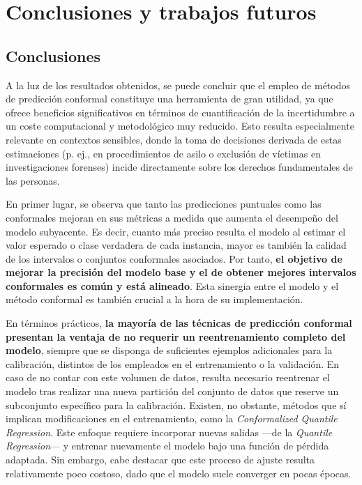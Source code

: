 \chapter{Conclusiones y trabajos futuros}

\section{Conclusiones}



A la luz de los resultados obtenidos, se puede concluir que el empleo de métodos de predicción conformal constituye una herramienta de gran utilidad, ya que ofrece beneficios significativos en términos de cuantificación de la incertidumbre a un coste computacional y metodológico muy reducido. Esto resulta especialmente relevante en contextos sensibles, donde la toma de decisiones derivada de estas estimaciones (p. ej., en procedimientos de asilo o exclusión de víctimas en investigaciones forenses) incide directamente sobre los derechos fundamentales de las personas.


En primer lugar, se observa que tanto las predicciones puntuales como las conformales mejoran en sus métricas a medida que aumenta el desempeño del modelo subyacente. Es decir, cuanto más preciso resulta el modelo al estimar el valor esperado o clase verdadera de cada instancia, mayor es también la calidad de los intervalos o conjuntos conformales asociados. Por tanto, \textbf{el objetivo de mejorar la precisión del modelo base y el de obtener mejores intervalos conformales es común y está alineado}. Esta sinergia entre el modelo y el método conformal es también crucial a la hora de su implementación.

En términos prácticos, \textbf{la mayoría de las técnicas de predicción conformal presentan la ventaja de no requerir un reentrenamiento completo del modelo}, siempre que se disponga de suficientes ejemplos adicionales para la calibración, distintos de los empleados en el entrenamiento o la validación. En caso de no contar con este volumen de datos, resulta necesario reentrenar el modelo tras realizar una nueva partición del conjunto de datos que reserve un subconjunto específico para la calibración.
Existen, no obstante, métodos que sí implican modificaciones en el entrenamiento, como la \textit{Conformalized Quantile Regression}. Este enfoque requiere incorporar nuevas salidas ---de la \textit{Quantile Regression}--- y entrenar nuevamente el modelo bajo una función de pérdida adaptada. Sin embargo, cabe destacar que este proceso de ajuste resulta relativamente poco costoso, dado que el modelo suele converger en pocas épocas.


